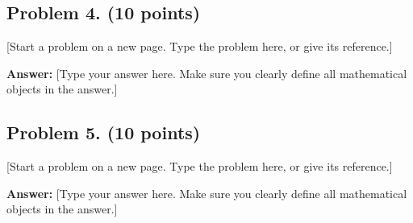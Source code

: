 \documentclass[12pt]{article}
\begin{document}
\newpage
\subsection*{Problem 4. (10 points)} [Start a problem on a new page. Type the problem here, or give its reference.]

\medskip
\noindent\textbf{Answer:} [Type your answer here. Make sure you clearly define all mathematical objects in the answer.]

\newpage
\subsection*{Problem 5. (10 points)} [Start a problem on a new page. Type the problem here, or give its reference.]

\medskip
\noindent\textbf{Answer:} [Type your answer here. Make sure you clearly define all mathematical objects in the answer.]
\end{document}

